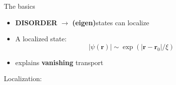 \documentclass[1pt]{beamer}
\begin{document}
\begin{frame}{The basics}
\begin{minipage}[c]{0.5\textwidth}
\begin{itemize}
\item \textbf{DISORDER} $\rightarrow$ \textbf{(eigen)}states can localize
\vspace{10mm}
\item A localized state:
$$|\psi(\mathbf{r})| \sim \exp\left(|\mathbf{r} - \mathbf{r}_0 |/\xi \right)$$
\vspace{5mm}
\item explains \textbf{vanishing} transport
\vspace{10mm}
\end{itemize}
\end{minipage}
\begin{minipage}[c]{0.4\textwidth}
\centering
Localization:
\begin{figure}
\end{figure}
\end{minipage}
\end{frame}
\end{document}
